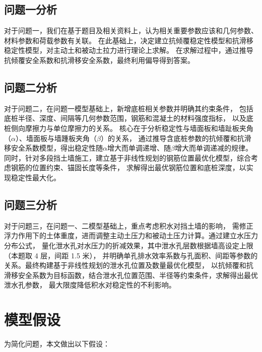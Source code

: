 \documentclass[withoutpreface,bwprint]{cumcmthesis}
\begin{document}
\subsection{问题一分析}
对于问题一，我们在基于题目及相关资料上，认为相关重要参数应该和几何参数、材料参数和荷载参数有关联。
在此基础上，决定建立抗倾覆稳定性模型和抗滑移稳定性模型，对主动土和被动土拉力进行理论上求解。
在求解过程中，通过推导抗倾覆安全系数和抗滑移安全系数，最终利用偏导得到答案。

\subsection{问题二分析}	
对于问题二，在问题一模型基础上，新增底桩相关参数并明确其约束条件，
包括底桩半径、深度、间隔等几何参数范围，钢筋和混凝土的材料强度指标，
以及底桩侧向摩擦力与单位摩擦力的关系。
核心在于分析稳定性与墙面板和墙趾板夹角（\(\alpha\)）、墙面板与墙踵板夹角（\(\beta\)）的关系，
通过推导含底桩参数的抗倾覆和抗滑移安全系数模型，得出稳定性随\(\alpha\)增大而单调递增、随\(\beta\)增大而单调递减的规律。
同时，针对多段挡土墙施工，建立基于非线性规划的钢筋位置最优化模型，综合考虑钢筋的位置约束、锚固长度等条件，
求解得出最优钢筋位置和底桩深度，以实现稳定性最大化。

\subsection{问题三分析}
对于问题三，在问题一、二模型基础上，重点考虑积水对挡土墙的影响，
需修正浮力作用下的土体重度，进而调整主动土压力和被动土压力计算。通过建立水压力分布公式，
量化泄水孔对水压力的折减效果，其中泄水孔层数根据墙高设定上限（本题取 4 层，间距 1.5 米），
并明确单孔排水效率系数与孔面积、间距等参数的关系。最终构建基于非线性规划的泄水孔位置及数量最优化模型，
以抗倾覆和抗滑移安全系数为目标函数，结合泄水孔位置范围、半径等约束条件，求解得出最优泄水孔参数，
最大限度降低积水对稳定性的不利影响。



\section{模型假设}

为简化问题，本文做出以下假设：
\end{document}
